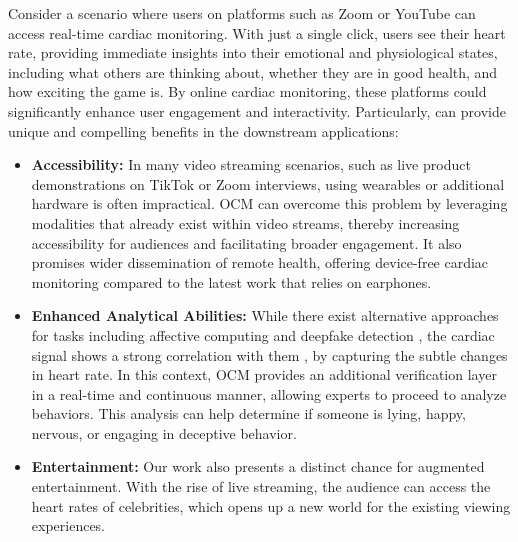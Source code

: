 Consider a scenario where users on platforms such as Zoom or YouTube can access real-time cardiac monitoring. With just a single click, users see their heart rate, providing immediate insights into their emotional and physiological states, including what others are thinking about, whether they are in good health, and how exciting the game is. By online cardiac monitoring, these platforms could significantly enhance user engagement and interactivity. Particularly, \sysname can provide unique and compelling benefits in the downstream applications:

\begin{itemize}
    \item \textbf{Accessibility:} In many video streaming scenarios, such as live product demonstrations on TikTok or Zoom interviews, using wearables or additional hardware is often impractical. OCM can overcome this problem by leveraging modalities that already exist within video streams, thereby increasing accessibility for audiences and facilitating broader engagement.  It also promises wider dissemination of remote health, offering device-free cardiac monitoring compared to the latest work \cite{chen2024exploring} that relies on earphones. 

    \item \textbf{Enhanced Analytical Abilities:} While there exist alternative approaches for tasks including affective computing \cite{mottelson2016affect, prajwal2023towards, wu2020emo, ahmad2024detecting} and deepfake detection \cite{yang2023avoid, demir2021deep}, the cardiac signal shows a strong correlation with them \cite{wascher2021heart, prajwal2023towards}, by capturing the subtle changes in heart rate. In this context, OCM provides an additional verification layer in a real-time and continuous manner, allowing experts to proceed to analyze behaviors. This analysis can help determine if someone is lying, happy, nervous, or engaging in deceptive behavior. 

    \item \textbf{Entertainment:} Our work also presents a distinct chance for augmented entertainment. With the rise of live streaming, the audience can access the heart rates of celebrities, which opens up a new world for the existing viewing experiences.  
\end{itemize}


